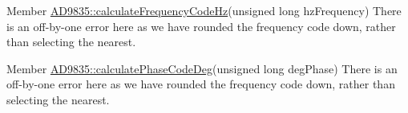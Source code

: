 \label{todo__todo000001}
\hypertarget{todo__todo000001}{}
 
\begin{DoxyDescription}
\item[Member \hyperlink{class_a_d9835_ad4a64d42b806f67e57eb37db913e3873}{AD9835::calculateFrequencyCodeHz}(unsigned long hzFrequency) ]There is an off-\/by-\/one error here as we have rounded the frequency code down, rather than selecting the nearest. 
\end{DoxyDescription}

\label{todo__todo000002}
\hypertarget{todo__todo000002}{}
 
\begin{DoxyDescription}
\item[Member \hyperlink{class_a_d9835_a18b0df58efdb5ba15ffc406f299f869c}{AD9835::calculatePhaseCodeDeg}(unsigned long degPhase) ]There is an off-\/by-\/one error here as we have rounded the frequency code down, rather than selecting the nearest. 
\end{DoxyDescription}